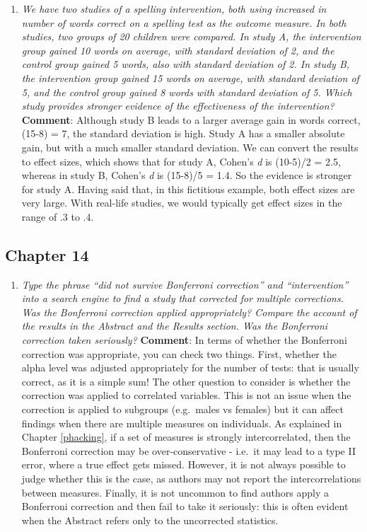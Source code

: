 \documentclass{krantz}
\providecommand{\tightlist}{%
\setlength{\itemsep}{0pt}\setlength{\parskip}{0pt}}
\begin{document}
\begin{enumerate}
\def\labelenumi{\arabic{enumi}.}
\tightlist
\item
  \emph{We have two studies of a spelling intervention, both using increased in number of words correct on a spelling test as the outcome measure. In both studies, two groups of 20 children were compared. In study A, the intervention group gained 10 words on average, with standard deviation of 2, and the control group gained 5 words, also with standard deviation of 2. In study B, the intervention group gained 15 words on average, with standard deviation of 5, and the control group gained 8 words with standard deviation of 5. Which study provides stronger evidence of the effectiveness of the intervention?}\\
  \textbf{Comment}: Although study B leads to a larger average gain in words correct, (15-8) = 7, the standard deviation is high. Study A has a smaller absolute gain, but with a much smaller standard deviation. We can convert the results to effect sizes, which shows that for study A, Cohen's \emph{d} is (10-5)/2 = 2.5, whereas in study B, Cohen's \emph{d} is (15-8)/5 = 1.4. So the evidence is stronger for study A. Having said that, in this fictitious example, both effect sizes are very large. With real-life studies, we would typically get effect sizes in the range of .3 to .4.
\end{enumerate}

\hypertarget{chapter-14}{%
\subsection{Chapter 14}\label{chapter-14}}

\begin{enumerate}
\def\labelenumi{\arabic{enumi}.}
\tightlist
\item
  \emph{Type the phrase ``did not survive Bonferroni correction'' and ``intervention'' into a search engine to find a study that corrected for multiple corrections. Was the Bonferroni correction applied appropriately? Compare the account of the results in the Abstract and the Results section. Was the Bonferroni correction taken seriously?}
  \textbf{Comment}: In terms of whether the Bonferroni correction was appropriate, you can check two things. First, whether the alpha level was adjusted appropriately for the number of tests: that is usually correct, as it is a simple sum! The other question to consider is whether the correction was applied to correlated variables. This is not an issue when the correction is applied to subgroups (e.g.~males vs females) but it can affect findings when there are multiple measures on individuals. As explained in Chapter \ref{phacking}, if a set of measures is strongly intercorrelated, then the Bonferroni correction may be over-conservative - i.e.~it may lead to a type II error, where a true effect gets missed. However, it is not always possible to judge whether this is the case, as authors may not report the intercorrelations between measures. Finally, it is not uncommon to find authors apply a Bonferroni correction and then fail to take it seriously: this is often evident when the Abstract refers only to the uncorrected statistics.
\end{enumerate}
\end{document}
